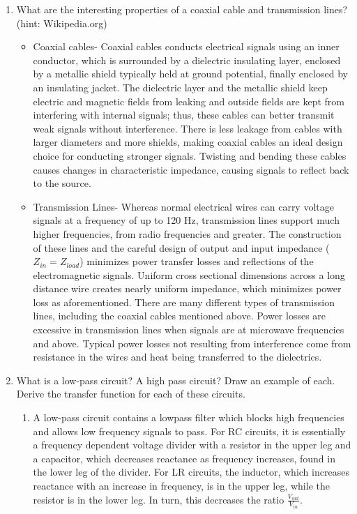 \documentclass{article}
\begin{document}
\begin{enumerate}
\begin{itemize}
    \end{itemize}
    \item What are the interesting properties of a coaxial cable and transmission lines? (hint: Wikipedia.org)
    \begin{itemize}
        \item Coaxial cables- Coaxial cables conducts electrical signals using an inner conductor, which is surrounded by a dielectric insulating layer, enclosed by a metallic shield typically held at ground potential, finally enclosed by an insulating jacket. The dielectric layer and the metallic shield keep electric and magnetic fields from leaking and outside fields are kept from interfering with internal signals; thus, these cables can better transmit weak signals without interference. There is less leakage from cables with larger diameters and more shields, making coaxial cables an ideal design choice for conducting stronger signals. Twisting and bending these cables causes changes in characteristic impedance, causing signals to reflect back to the source. 
        \item Transmission Lines- Whereas normal electrical wires can carry voltage signals at a frequency of up to 120 Hz, transmission lines support much higher frequencies, from radio frequencies and greater. The construction of these lines and the careful design of output and input impedance ($Z_{in} = Z_{load}$) minimizes power transfer losses and reflections of the electromagnetic signals. Uniform cross sectional dimensions across a long distance wire creates nearly uniform impedance, which minimizes power loss as aforementioned. There are many different types of transmission lines, including the coaxial cables mentioned above. Power losses are excessive in transmission lines when signals are at microwave frequencies and above. Typical power losses not resulting from interference come from resistance in the wires and heat being transferred to the dielectrics. 
    \end{itemize}
    \item What is a low-pass circuit? A high pass circuit? Draw an example of each. Derive the transfer function for each of these circuits.
    \begin{enumerate}
        \item A low-pass circuit contains a lowpass filter which blocks high frequencies and allows low frequency signals to pass. For RC circuits, it is essentially a frequency dependent voltage divider with a resistor in the upper leg and a capacitor, which decreases reactance as frequency increases, found in the lower leg of the divider. For LR circuits, the inductor, which increases reactance with an increase in frequency, is in the upper leg, while the resistor is in the lower leg. In turn, this decreases the ratio $\frac{V_{out}}{V_{in}}$.\\

\end{enumerate}
\end{enumerate}
\end{document}
